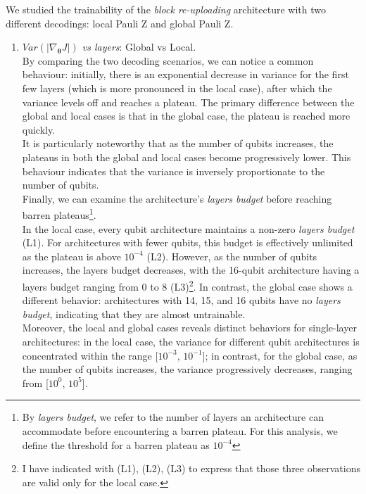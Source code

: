 We studied the trainability of the \textit{block re-uploading} architecture with two different decodings:
local Pauli Z and global Pauli Z.\\ 

\begin{enumerate}
    \item \textit{$Var(|\nabla_{\bm{\theta}}J|)$ vs layers}: Global vs Local.\\
    By comparing the two decoding scenarios, we can notice a common behaviour:
    initially, there is an exponential decrease in variance for the first few layers (which is more pronounced 
    in the local case), after which the variance levels off and reaches a plateau.
    The primary difference between the global and local cases is that in the global case, 
    the plateau is reached more quickly.\\
    It is particularly noteworthy that as the number of qubits increases, 
    the plateaus in both the global and local cases become progressively lower.
    This behaviour indicates that the variance is inversely proportionate to the number of qubits.\\
    Finally, we can examine the architecture’s \textit{layers budget} before reaching barren 
    plateaus\footnote[1]{By \textit{layers budget}, we refer to the number of layers an architecture 
    can accommodate before encountering a barren plateau. For this analysis, we define the 
    threshold for a barren plateau as $10^{-4}$}.\\
    In the local case, every qubit architecture maintains 
    a non-zero \textit{layers budget} (L1). For architectures with fewer qubits, this budget is effectively 
    unlimited as the plateau is above $10^{-4}$ (L2). However, as the number of qubits increases, 
    the layers budget decreases, with the 16-qubit architecture having a layers budget ranging from 
    0 to 8 (L3)\footnote[2]{I have indicated with (L1), (L2), (L3) to express that those three 
    observations are valid only for the local case.}. 
    In contrast, the global case shows a different behavior: architectures with 14, 15, and 
    16 qubits have no \textit{layers budget}, indicating that they are almost untrainable.\\
    Moreover, the local and global cases reveals distinct behaviors for single-layer architectures: 
    in the local case, the variance for different qubit architectures is concentrated within the range 
    [$10^{-3}$, $10^{-1}$]; in contrast, for the global case, as the number of qubits increases, 
    the variance progressively decreases, ranging from [$10^0$, $10^5$].


\end{enumerate}
